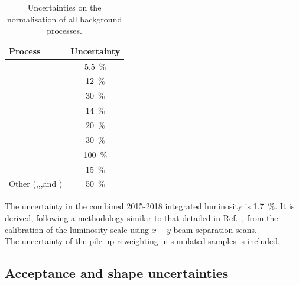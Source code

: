 \begin{table}[t]
	\small
	\centering
	\begin{tabular}{l c }
		\toprule
		\textbf{Process} & Uncertainty \\
		\midrule
		\ttbar & \SI{5.5}{\%} \\
		\ttV    & \SI{12}{\%} \\
		\tWZ & \SI{30}{\%} \\
		\tZq & \SI{14}{\%} \\
		\VVLF & \SI{20}{\%} \\
		\VVHF & \SI{30}{\%} \\
		\Zjets & \SI{100}{\%} \\
		 \ttH    & \SI{15}{\%} \\
		Other (\ttt,\tttt,\VVV,\VH and \ttWW) & \SI{50}{\%} \\		
		\bottomrule
	\end{tabular}
	\caption{Uncertainties on the normalisation of all background processes.}
	\label{tab:syst-crosssections}
\end{table}
\FloatBarrier
\noindent The uncertainty in the combined 2015-2018 integrated luminosity is
\SI{1.7}{\%}. It is derived, following a methodology similar to that
detailed in Ref.~\cite{DAPR-2013-01}, from the calibration of the
luminosity scale using $x-y$ beam-separation scans.\\
The uncertainty of the pile-up reweighting in simulated samples is included.

\subsection {Acceptance and shape uncertainties}
\label{sec:systematic:treatment}

